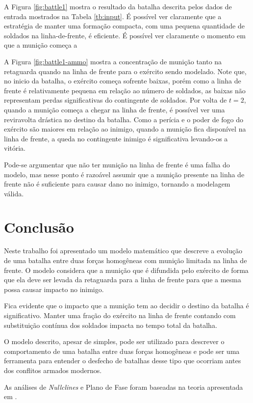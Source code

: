 \documentclass{article}
\begin{document}
A Figura \ref{fig:battle1} mostra o resultado da batalha descrita pelos dados de entrada mostrados na Tabela \ref{tb:input}. É possível ver claramente que a estratégia de manter uma formação compacta, com uma pequena quantidade de soldados na linha-de-frente, é eficiente. É possível ver claramente o momento em que a munição começa a 

A Figura \ref{fig:battle1-ammo} mostra a concentração de munição tanto na retaguarda quando na linha de frente para o exército sendo modelado. Note que, no inicio da batalha, o exército começa sofrente baixas, porém como a linha de frente é relativamente pequena em relação ao número de soldados, as baixas não representam perdas significativas do contingente de soldados. Por volta de $t = 2$, quando a munição começa a chegar na linha de frente, é possível ver uma reviravolta drástica no destino da batalha. Como a perícia e o poder de fogo do exército são maiores em relação ao inimigo, quando a munição fica disponível na linha de frente, a queda no contingente inimigo é significativa levando-os a vitória.

Pode-se argumentar que não ter munição na linha de frente é uma falha do modelo, mas nesse ponto é razoável assumir que a munição presente na linha de frente não é suficiente para causar dano no inimigo, tornando a modelagem válida.

\section{Conclusão}

Neste trabalho foi apresentado um modelo matemático que descreve a evolução de uma batalha entre duas forças homogêneas com munição limitada na linha de frente. O modelo considera que a munição que é difundida pelo exército de forma que ela deve ser levada da retaguarda para a linha de frente para que a mesma possa causar impacto no inimigo.

Fica evidente que o impacto que a munição tem ao decidir o destino da batalha é significativo. Manter uma fração do exército na linha de frente contando com substituição contínua dos soldados impacta no tempo total da batalha.

O modelo descrito, apesar de simples, pode ser utilizado para descrever o comportamento de uma batalha entre duas forças homogêneas e pode ser uma ferramenta para entender o desfecho de batalhas desse tipo que ocorriam antes dos conflitos armados modernos.

As análises de \textit{Nullclines} e Plano de Fase foram baseadas na teoria apresentada em \cite{chaos}.





\end{document}
